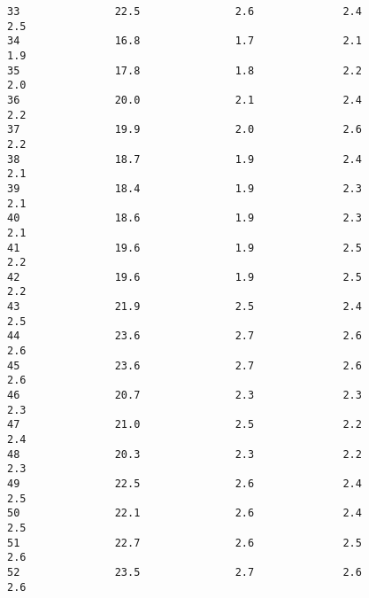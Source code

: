 \documentclass[11pt]{article}
\begin{document}
\begin{Verbatim}[commandchars=\\\{\}]
33               22.5               2.6              2.4               2.5   
34               16.8               1.7              2.1               1.9   
35               17.8               1.8              2.2               2.0   
36               20.0               2.1              2.4               2.2   
37               19.9               2.0              2.6               2.2   
38               18.7               1.9              2.4               2.1   
39               18.4               1.9              2.3               2.1   
40               18.6               1.9              2.3               2.1   
41               19.6               1.9              2.5               2.2   
42               19.6               1.9              2.5               2.2   
43               21.9               2.5              2.4               2.5   
44               23.6               2.7              2.6               2.6   
45               23.6               2.7              2.6               2.6   
46               20.7               2.3              2.3               2.3   
47               21.0               2.5              2.2               2.4   
48               20.3               2.3              2.2               2.3   
49               22.5               2.6              2.4               2.5   
50               22.1               2.6              2.4               2.5   
51               22.7               2.6              2.5               2.6   
52               23.5               2.7              2.6               2.6   


\end{Verbatim}
\end{document}
